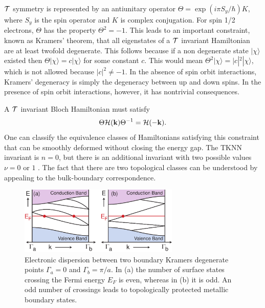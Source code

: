 \documentclass[twocolumn,floatfix,showpacs,rmp,aps]{revtex4}
\begin{document}
${\cal T}$ symmetry is represented by an antiunitary operator
$\Theta = \exp(i\pi S_y/\hbar) K$, where $S_y$ is the spin
operator and $K$ is complex conjugation.
For spin 1/2 electrons, $\Theta$ has the property $\Theta^2 = -1$.
This leads to an important constraint, known as Kramers' theorem,
that all eigenstates of a ${\cal T}$ invariant Hamiltonian
are at least twofold degenerate.
This follows because if a non degenerate state $|\chi\rangle$ existed then
$\Theta |\chi\rangle = c |\chi\rangle$ for some constant $c$.  This would mean $\Theta^2
|\chi\rangle = |c|^2 |\chi\rangle$, which is not allowed because
$|c|^2 \ne -1$.  In the absence of spin orbit interactions, Kramers'
degeneracy is simply the degeneracy between up and down spins.  In
the presence of spin orbit interactions, however, it has nontrivial
consequences.

A ${\cal T}$ invariant Bloch Hamiltonian must satisfy
\begin{equation}
\Theta {\cal H}({\bf k}) \Theta^{-1} = {\cal H}(-{\bf k}).
\label{trsym}
\end{equation}
One can classify the equivalence classes of
Hamiltonians satisfying this constraint that can be smoothly deformed
without closing the energy gap.  The TKNN invariant is $n=0$, but
there is an additional invariant with
two possible values $\nu = 0$ or $1$ \cite{kanemele05b}.   The fact that there are two
topological classes can be understood
by appealing to the bulk-boundary correspondence.

\begin{figure}
\includegraphics[width=3in]{Fig3}
\caption{Electronic dispersion between two boundary Kramers degenerate points
$\Gamma_a=0$ and $\Gamma_b=\pi/a$.  In (a) the number of surface states crossing the Fermi
energy $E_F$ is even, whereas in (b) it is odd.
An odd number of crossings leads to topologically protected metallic boundary states.}
\label{fig:zigzag}
\end{figure}
\end{document}
